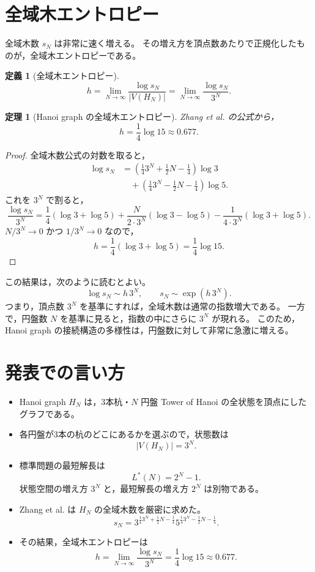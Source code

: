 \documentclass[a4paper,11pt]{ltjsarticle}
\theoremstyle{definition}
\newtheorem{definition}{定義}[section]
\theoremstyle{plain}
\newtheorem{theorem}{定理}[section]
\theoremstyle{remark}
\newcommand{\HN}{H_N}
\begin{document}
\section{全域木エントロピー}

全域木数 \(s_N\) は非常に速く増える。
その増え方を頂点数あたりで正規化したものが，全域木エントロピーである。

\begin{definition}[全域木エントロピー]
\[
  h
  =
  \lim_{N\to\infty}
  \frac{\log s_N}{|V(\HN)|}
  =
  \lim_{N\to\infty}
  \frac{\log s_N}{3^N}.
\]
\end{definition}

\begin{theorem}[Hanoi graph の全域木エントロピー]
Zhang et al. の公式から，
\[
  h
  =
  \frac{1}{4}\log 15
  \approx 0.677.
\]
\end{theorem}

\begin{proof}
全域木数公式の対数を取ると，
\[
\begin{aligned}
\log s_N
&=
\left(\frac{1}{4}3^N+\frac{1}{2}N-\frac{1}{4}\right)\log 3\\
&\quad+
\left(\frac{1}{4}3^N-\frac{1}{2}N-\frac{1}{4}\right)\log 5.
\end{aligned}
\]
これを \(3^N\) で割ると，
\[
\frac{\log s_N}{3^N}
=
\frac{1}{4}(\log 3+\log 5)
+ \frac{N}{2\cdot 3^N}(\log 3-\log 5)
- \frac{1}{4\cdot 3^N}(\log 3+\log 5).
\]
\(N/3^N\to 0\) かつ \(1/3^N\to0\) なので，
\[
  h
  =
  \frac{1}{4}(\log 3+\log 5)
  =
  \frac{1}{4}\log 15.
\]
\end{proof}

この結果は，次のように読むとよい。
\[
  \log s_N \sim h\,3^N,
  \qquad
  s_N \sim \exp(h\,3^N).
\]
つまり，頂点数 \(3^N\) を基準にすれば，全域木数は通常の指数増大である。
一方で，円盤数 \(N\) を基準に見ると，指数の中にさらに \(3^N\) が現れる。
このため，Hanoi graph の接続構造の多様性は，円盤数に対して非常に急激に増える。

\section{発表での言い方}

\begin{itemize}
\item Hanoi graph \(\HN\) は，3本杭・\(N\) 円盤 Tower of Hanoi の全状態を頂点にしたグラフである。
\item 各円盤が3本の杭のどこにあるかを選ぶので，状態数は
\[
  |V(\HN)|=3^N.
\]
\item 標準問題の最短解長は
\[
  L^*(N)=2^N-1.
\]
状態空間の増え方 \(3^N\) と，最短解長の増え方 \(2^N\) は別物である。
\item Zhang et al. は \(\HN\) の全域木数を厳密に求めた。
\[
  s_N
  =
  3^{\frac{1}{4}3^N+\frac{1}{2}N-\frac{1}{4}}
  5^{\frac{1}{4}3^N-\frac{1}{2}N-\frac{1}{4}}.
\]
\item その結果，全域木エントロピーは
\[
  h=\lim_{N\to\infty}\frac{\log s_N}{3^N}
  =\frac{1}{4}\log 15
  \approx0.677.
\]
\end{itemize}
\end{document}
